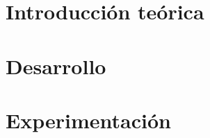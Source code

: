 \documentclass[12pt, a4paper]{report}
\begin{document}


\tableofcontents{}

\chapter{Introducción teórica} 


\chapter{Desarrollo}


\chapter{Experimentación}

\end{document}
